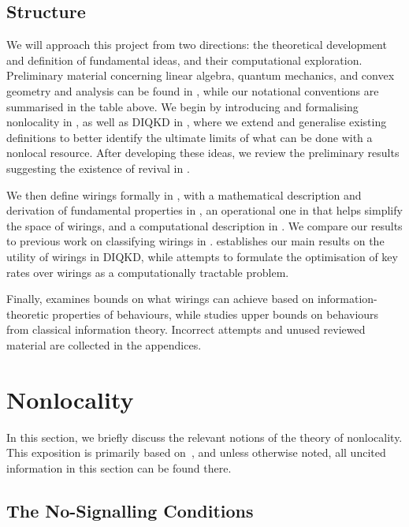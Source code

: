 \documentclass[10pt, a4paper]{article}
\numberwithin{equation}{section} %
\theoremstyle{definition}
\theoremstyle{plain}
\newcommand{\?}{\mathrel{?}} %
\begin{document}
    \subsection{Structure}

    We will approach this project from two directions: the theoretical development and definition of fundamental ideas, and their computational exploration. Preliminary material concerning linear algebra, quantum mechanics, and convex geometry and analysis can be found in , while our notational conventions are summarised in the table above. We begin by introducing and formalising nonlocality in , as well as DIQKD in , where we extend and generalise existing definitions to better identify the ultimate limits of what can be done with a nonlocal resource. After developing these ideas, we review the preliminary results suggesting the existence of revival in .

    We then define wirings formally in , with a mathematical description and derivation of fundamental properties in , an operational one in  that helps simplify the space of wirings, and a computational description in . We compare our results to previous work on classifying wirings in .  establishes our main results on the utility of wirings in DIQKD, while  attempts to formulate the optimisation of key rates over wirings as a computationally tractable problem.

    Finally,  examines bounds on what wirings can achieve based on information-theoretic properties of behaviours, while  studies upper bounds on behaviours from classical information theory. Incorrect attempts and unused reviewed material are collected in the appendices.

    \section{Nonlocality}\label{sec:nl}

    In this section, we briefly discuss the relevant notions of the theory of nonlocality. This exposition is primarily based on~\cite{BellNonlocality}, and unless otherwise noted, all uncited information in this section can be found there.

    \subsection{The No-Signalling Conditions}\label{sec:nl_ns}
\end{document}
